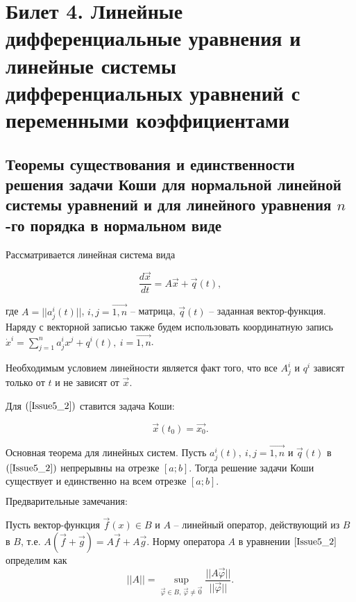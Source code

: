 \section{Билет 4. Линейные дифференциальные уравнения и линейные системы дифференциальных уравнений с переменными коэффициентами}

\subsection{Теоремы существования и единственности решения задачи Коши для нормальной линейной системы уравнений и
для линейного уравнения $n$-го порядка в нормальном виде}

Рассматривается линейная система вида

\begin{equation}
	\frac{d\overrightarrow{x}}{dt} = A\overrightarrow{x} + \overrightarrow{q}(t),
	\label{Issue5_2}
\end{equation} 

где $A = ||a_j^i(t)||$, $i, j = \overrightarrow{1, n}$ -- матрица, $\overrightarrow{q}(t)$ -- заданная вектор-функция. Наряду с векторной записью также будем использовать координатную запись $\dot{x}^i = \sum\limits_{j = 1}^{n} a_j^i x^j + q^i(t),\ i = \overrightarrow{1, n}$.

$\textbf{Необходимым условием линейности}$ является факт того, что все $A_j^i$ и $q^i$ зависят только от $t$ и не зависят от $\overrightarrow{x}$.

Для $(\ref{Issue5_2})$ ставится задача Коши:

\[ \overrightarrow{x}(t_0) = \overrightarrow{x_0}.\]

\begin{theorem}

$\textbf{Основная теорема для линейных систем.}$ Пусть $a_j^i(t),\ i, j = \overrightarrow{1, n}$ и $\overrightarrow{q}(t)$ в $(\ref{Issue5_2})$ непрерывны на отрезке $[a;b]$. Тогда решение задачи Коши существует и единственно на всем отрезке $[a;b].$

\end{theorem}

$\textbf{Предварительные замечания:}$

Пусть вектор-функция $\overrightarrow{f}(x) \in B$ и $A$ -- линейный оператор, действующий из $B$ в $B$, т.е. $A(\overrightarrow{f} + \overrightarrow{g}) = A\overrightarrow{f} + A\overrightarrow{g}$.
Норму оператора $A$ в уравнении $\eqref{Issue5_2}$ определим как
\[ ||A|| =  \sup\limits_{\overrightarrow{\varphi} \in B,\ \overrightarrow{\varphi} \neq \overrightarrow{0}} \frac{||A\overrightarrow{\varphi}||}{||\overrightarrow{\varphi}||}. \]

